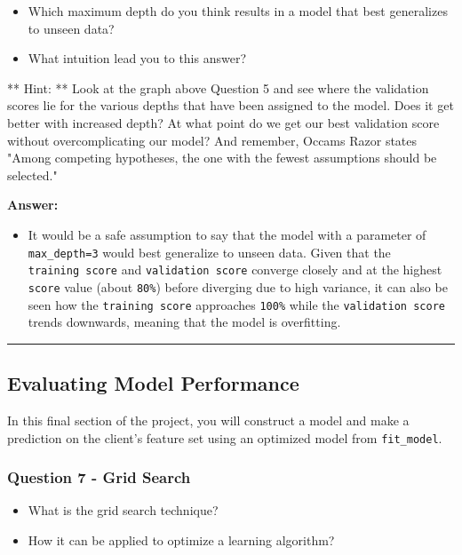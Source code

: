 \documentclass[11pt]{article}
\providecommand{\tightlist}{%
      \setlength{\itemsep}{0pt}\setlength{\parskip}{0pt}}
\begin{document}
\begin{itemize}
\tightlist
\item
  Which maximum depth do you think results in a model that best
  generalizes to unseen data?
\item
  What intuition lead you to this answer?
\end{itemize}

** Hint: ** Look at the graph above Question 5 and see where the
validation scores lie for the various depths that have been assigned to
the model. Does it get better with increased depth? At what point do we
get our best validation score without overcomplicating our model? And
remember, Occams Razor states "Among competing hypotheses, the one with
the fewest assumptions should be selected."

    \textbf{Answer: }

\begin{itemize}
\tightlist
\item
  It would be a safe assumption to say that the model with a parameter
  of \texttt{max\_depth=3} would best generalize to unseen data. Given
  that the \texttt{training\ score} and \texttt{validation\ score}
  converge closely and at the highest \texttt{score} value (about
  \texttt{80\%}) before diverging due to high variance, it can also be
  seen how the \texttt{training\ score} approaches \texttt{100\%} while
  the \texttt{validation\ score} trends downwards, meaning that the
  model is overfitting.
\end{itemize}

    \begin{center}\rule{0.5\linewidth}{\linethickness}\end{center}

\subsection{Evaluating Model
Performance}\label{evaluating-model-performance}

In this final section of the project, you will construct a model and
make a prediction on the client's feature set using an optimized model
from \texttt{fit\_model}.

    \subsubsection{Question 7 - Grid Search}\label{question-7---grid-search}

\begin{itemize}
\tightlist
\item
  What is the grid search technique?
\item
  How it can be applied to optimize a learning algorithm?
\end{itemize}
\end{document}
